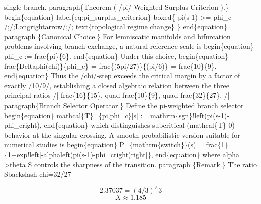 single branch. paragraph\{Theorem ( /pi/-Weighted Surplus Criterion ).\} begin\{equation\} label\{eq:pi\_surplus\_criterion\} boxed\{ pi(s-1) >= phi\_c /;/;Longrightarrow/;/; text\{topological regime change\} \} end\{equation\} paragraph \{Canonical Choice.\} For lemniscatic manifolds and bifurcation problems involving branch exchange, a natural reference scale is begin\{equation\} phi\_c := frac\{pi\}\{6\}. end\{equation\} Under this choice, begin\{equation\} frac\{Deltaphi(chi)\}\{phi\_c\} = frac\{(5pi/27)\}\{(pi/6)\} = frac\{10\}\{9\}. end\{equation\} Thus the /chi/-step exceeds the critical margin by a factor of exactly /10/9/, establishing a closed algebraic relation between the three principal ratios /[ frac\{16\}\{15\}, quad frac\{10\}\{9\}, quad frac\{32\}\{27\}. /] paragraph\{Branch Selector Operator.\} Define the pi-weighted branch selector begin\{equation\} mathcal\{T\}\_\{pi,phi\_c\}[s] := mathrm\{sgn\}!left(pi(s-1)-phi\_cright), end\{equation\} which distinguishes subcritical (mathcal\{T\} 0) behavior at the singular crossing. A smooth probabilistic version suitable for numerical studies is begin\{equation\} P\_\{mathrm\{switch\}\}(s) = frac\{1\}\{1+exp!left[-alphaleft(pi(s-1)-phi\_cright)right]\}, end\{equation\} where alpha >theta S controls the sharpness of the transition. paragraph \{Remark.\} The ratio Sbackslash chi=32/27

\[
2.37037=(4/3)^{\wedge}3
\]
\[
X\approx1.185
\]

